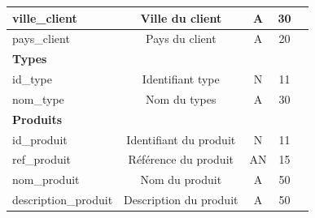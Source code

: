 \documentclass[french]{article}
\begin{document}
\begin{table}[!htbp]
\begin{tabular}{|lcccl|}
\multicolumn{1}{|l|}{ville\_client}        & \multicolumn{1}{c|}{Ville du client}             & \multicolumn{1}{c|}{A}             & \multicolumn{1}{c|}{30}              &                                                 \\ \hline
\multicolumn{1}{|l|}{pays\_client}         & \multicolumn{1}{c|}{Pays du client}              & \multicolumn{1}{c|}{A}             & \multicolumn{1}{c|}{20}              & \multicolumn{1}{c|}{}                           \\ \hline
\multicolumn{5}{|l|}{\textbf{Types}}                                                                                                                                                                \\ \hline
\multicolumn{1}{|l|}{id\_type}             & \multicolumn{1}{c|}{Identifiant type}            & \multicolumn{1}{c|}{N}             & \multicolumn{1}{c|}{11}              &                                                 \\ \hline
\multicolumn{1}{|l|}{nom\_type}            & \multicolumn{1}{c|}{Nom du types}                & \multicolumn{1}{c|}{A}             & \multicolumn{1}{c|}{30}              &                                                 \\ \hline
\multicolumn{5}{|l|}{\textbf{Produits}}                                                                                                                                                             \\ \hline
\multicolumn{1}{|l|}{id\_produit}          & \multicolumn{1}{c|}{Identifiant du produit}      & \multicolumn{1}{c|}{N}             & \multicolumn{1}{c|}{11}              &                                                 \\ \hline
\multicolumn{1}{|l|}{ref\_produit}         & \multicolumn{1}{c|}{Référence du produit}        & \multicolumn{1}{c|}{AN}            & \multicolumn{1}{c|}{15}              &                                                 \\ \hline
\multicolumn{1}{|l|}{nom\_produit}         & \multicolumn{1}{c|}{Nom du produit}              & \multicolumn{1}{c|}{A}             & \multicolumn{1}{c|}{50}              &                                                 \\ \hline
\multicolumn{1}{|l|}{description\_produit} & \multicolumn{1}{c|}{Description du produit}      & \multicolumn{1}{c|}{A}             & \multicolumn{1}{c|}{50}              &                                                 \\ \hline

\end{tabular}
\end{table}
\end{document}
